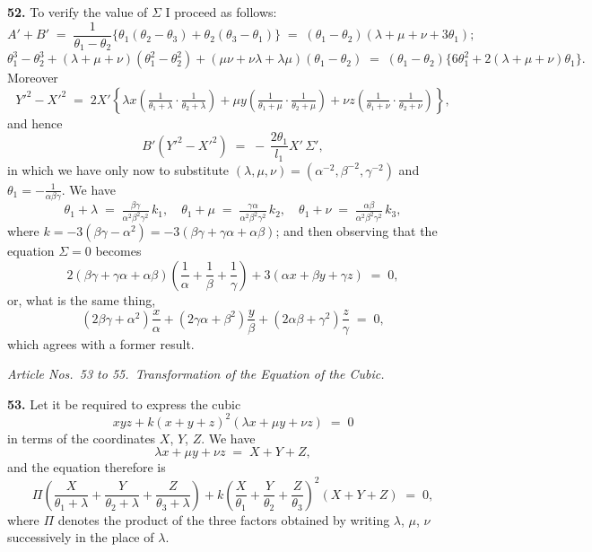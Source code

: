 \documentclass[11pt,a4paper]{article}
\begin{document}
\textbf{52.} To verify the value of $\Sigma$ I proceed as follows:
\[
A'+B' \;=\; \frac{1}{\theta_{1}-\theta_{2}}\bigl\{\theta_{1}(\theta_{2}-\theta_{3}) + \theta_{2}(\theta_{3}-\theta_{1})\bigr\} \;=\; (\theta_{1}-\theta_{2})(\lambda+\mu+\nu+3\theta_{1});
\]
\[
\theta_{1}^{3}-\theta_{2}^{3} + (\lambda+\mu+\nu)(\theta_{1}^{2}-\theta_{2}^{2}) + (\mu\nu+\nu\lambda+\lambda\mu)(\theta_{1}-\theta_{2}) \;=\; (\theta_{1}-\theta_{2})\bigl\{6\theta_{1}^{2}+2(\lambda+\mu+\nu)\theta_{1}\bigr\}.
\]
Moreover
\[
Y'^{2}-X'^{2} \;=\; 2 X'\!\left\{\lambda x\!\left(\tfrac{1}{\theta_{1}+\lambda}\cdot\tfrac{1}{\theta_{2}+\lambda}\right) + \mu y\!\left(\tfrac{1}{\theta_{1}+\mu}\cdot\tfrac{1}{\theta_{2}+\mu}\right) + \nu z\!\left(\tfrac{1}{\theta_{1}+\nu}\cdot\tfrac{1}{\theta_{2}+\nu}\right)\right\},
\]
and hence
\[
B'(Y'^{2}-X'^{2}) \;=\; -\,\frac{2\theta_{1}}{l_{1}}X'\,\Sigma',
\]
in which we have only now to substitute $(\lambda,\mu,\nu) = (\alpha^{-2},\beta^{-2},\gamma^{-2})$ and $\theta_{1} = -\tfrac{1}{\alpha\beta\gamma}$. We have
\[
\theta_{1}+\lambda \;=\; \tfrac{\beta\gamma}{\alpha^{2}\beta^{2}\gamma^{2}}\,k_{1},\quad \theta_{1}+\mu \;=\; \tfrac{\gamma\alpha}{\alpha^{2}\beta^{2}\gamma^{2}}\,k_{2},\quad \theta_{1}+\nu \;=\; \tfrac{\alpha\beta}{\alpha^{2}\beta^{2}\gamma^{2}}\,k_{3},
\]
where $k = -3(\beta\gamma-\alpha^{2}) = -3(\beta\gamma+\gamma\alpha+\alpha\beta)$; and then observing that the equation $\Sigma=0$ becomes
\[
2(\beta\gamma+\gamma\alpha+\alpha\beta)\!\left(\frac{1}{\alpha}+\frac{1}{\beta}+\frac{1}{\gamma}\right) + 3(\alpha x+\beta y+\gamma z) \;=\; 0,
\]
or, what is the same thing,
\[
(2\beta\gamma+\alpha^{2})\frac{x}{\alpha} + (2\gamma\alpha+\beta^{2})\frac{y}{\beta} + (2\alpha\beta+\gamma^{2})\frac{z}{\gamma} \;=\; 0,
\]
which agrees with a former result.

\medskip

\noindent\textit{Article Nos.\ 53 to 55.\ Transformation of the Equation of the Cubic.}

\medskip

\textbf{53.} Let it be required to express the cubic
\[
xyz + k(x+y+z)^{2}(\lambda x + \mu y + \nu z) \;=\; 0
\]
in terms of the coordinates $X$, $Y$, $Z$. We have
\[
\lambda x + \mu y + \nu z \;=\; X + Y + Z,
\]
and the equation therefore is
\[
\Pi\!\left(\frac{X}{\theta_{1}+\lambda}+\frac{Y}{\theta_{2}+\lambda}+\frac{Z}{\theta_{3}+\lambda}\right) + k\!\left(\frac{X}{\theta_{1}}+\frac{Y}{\theta_{2}}+\frac{Z}{\theta_{3}}\right)^{2}(X+Y+Z) \;=\; 0,
\]
where $\Pi$ denotes the product of the three factors obtained by writing $\lambda$, $\mu$, $\nu$ successively in the place of $\lambda$.
\end{document}
